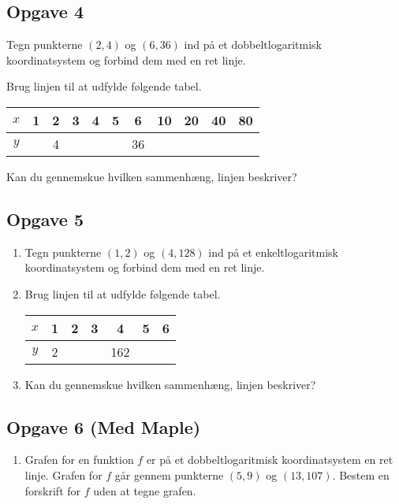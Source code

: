 \subsection*{Opgave 4}

\begin{enumerate}[label=\roman*)]
	\item Tegn punkterne $(2,4)$ og $(6,36)$ ind på et dobbeltlogaritmisk koordinatsystem og forbind dem med 
	en ret linje.
	\item Brug linjen til at udfylde følgende tabel.
	\begin{center}
		\begin{tabular}{c|c|c|c|c|c|c|c|c|c|c}
			$x$ & 1 & 2 & 3 & 4 & 5 & 6 & 10 & 20 & 40 & 80 \\
			\hline
			$y$ & \phantom{1} & 4  & \phantom{8}  &\phantom{16} & \phantom{32}  & 36  & \phantom{128}  & \phantom{256}  & \phantom{512}  & \phantom{1024}
		\end{tabular}
	\item Kan du gennemskue hvilken sammenhæng, linjen beskriver? 
	\end{center}
\end{enumerate}

\subsection*{Opgave 5}
\begin{enumerate}[label=\roman*)]
	\item Tegn punkterne $(1,2)$ og $(4,128)$ ind på et enkeltlogaritmisk koordinatsystem og forbind dem med en ret 
	linje.
	\item Brug linjen til at udfylde følgende tabel.
	\begin{center}
		\begin{tabular}{c|c|c|c|c|c|c}
			$x$ & 1 & 2 & 3 & 4 & 5 & 6  \\
			\hline
			$y$ & 2 & \phantom{18} & \phantom{54} & 162 & \phantom{486}& \phantom{600}
		\end{tabular}
	\end{center}
	\item Kan du gennemskue hvilken sammenhæng, linjen beskriver? 
\end{enumerate}

\subsection*{Opgave 6 (Med Maple)}
\begin{enumerate}[label=\roman*)]
	\item Grafen for en funktion $f$ er på et dobbeltlogaritmisk koordinatsystem en ret linje. Grafen for $f$
	går gennem punkterne $(5,9)$ og $(13,107)$. Bestem en forskrift for $f$ uden at tegne grafen. 
\end{enumerate}

